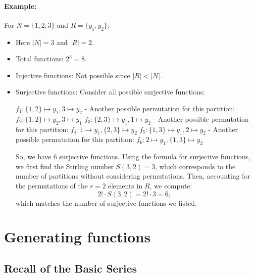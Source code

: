 \documentclass{article}
\begin{document}
\paragraph{Example:}  
For \( N = \{1, 2, 3\} \) and \( R = \{y_1, y_2\} \):
\begin{itemize}[nosep]
    \item[] Here \( |N| = 3 \) and \( |R| = 2 \).
    \item Total functions: $2^3 = 8$.
    \item Injective functions: Not possible since $|R|<|N|$.
    \item Surjective functions: Consider all possible surjective functions:

 \( f_1: \{1, 2\} \mapsto y_1, 3 \mapsto y_2 \)
- Another possible permutation for this partition: \( f_2: \{1, 2\} \mapsto y_2, 3 \mapsto y_1 \)
 \( f_3: \{2, 3\} \mapsto y_1, 1 \mapsto y_2 \)
- Another possible permutation for this partition: \( f_4: 1 \mapsto y_1, \{2, 3\} \mapsto y_2 \)
 \( f_5: \{1, 3\} \mapsto y_1, 2 \mapsto y_2 \)
- Another possible permutation for this partition: \( f_6: 2 \mapsto y_1, \{1, 3\} \mapsto y_2 \)

So, we have 6 surjective functions. Using the formula for surjective functions, we first find the Stirling number \( S(3, 2) = 3 \), which corresponds to the number of partitions without considering permutations. Then, accounting for the permutations of the \( r = 2 \) elements in \( R \), we compute:
\[
2! \cdot S(3, 2) = 2! \cdot 3 = 6,
\]
which matches the number of surjective functions we listed.
\end{itemize}

\section{Generating functions}
\subsection*{Recall of the Basic Series}
\end{document}
